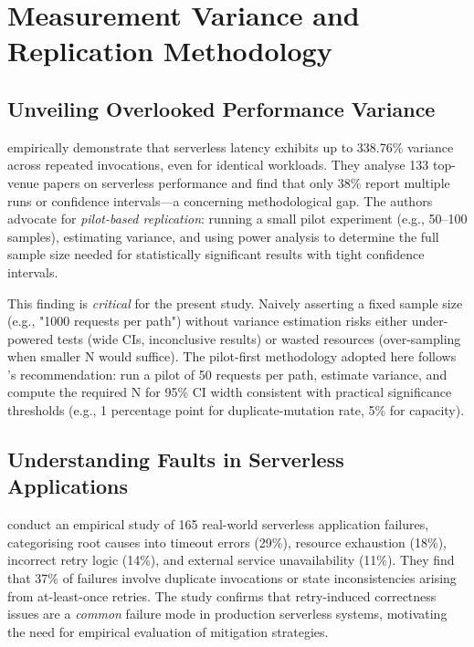 \section{Measurement Variance and Replication Methodology}

\subsection{Unveiling Overlooked Performance Variance}

\citet{Wen2025Variance} empirically demonstrate that serverless latency exhibits up to 338.76\% variance across repeated invocations, even for identical workloads. They analyse 133 top-venue papers on serverless performance and find that only 38\% report multiple runs or confidence intervals---a concerning methodological gap. The authors advocate for \textit{pilot-based replication}: running a small pilot experiment (e.g., 50--100 samples), estimating variance, and using power analysis to determine the full sample size needed for statistically significant results with tight confidence intervals.

This finding is \textit{critical} for the present study. Naively asserting a fixed sample size (e.g., "1000 requests per path") without variance estimation risks either under-powered tests (wide CIs, inconclusive results) or wasted resources (over-sampling when smaller N would suffice). The pilot-first methodology adopted here follows \citet{Wen2025Variance}'s recommendation: run a pilot of 50 requests per path, estimate variance, and compute the required N for 95\% CI width consistent with practical significance thresholds (e.g., 1 percentage point for duplicate-mutation rate, 5\% for capacity).

\subsection{Understanding Faults in Serverless Applications}

\citet{Xie2025Faults} conduct an empirical study of 165 real-world serverless application failures, categorising root causes into timeout errors (29\%), resource exhaustion (18\%), incorrect retry logic (14\%), and external service unavailability (11\%). They find that 37\% of failures involve duplicate invocations or state inconsistencies arising from at-least-once retries. The study confirms that retry-induced correctness issues are a \textit{common} failure mode in production serverless systems, motivating the need for empirical evaluation of mitigation strategies.

